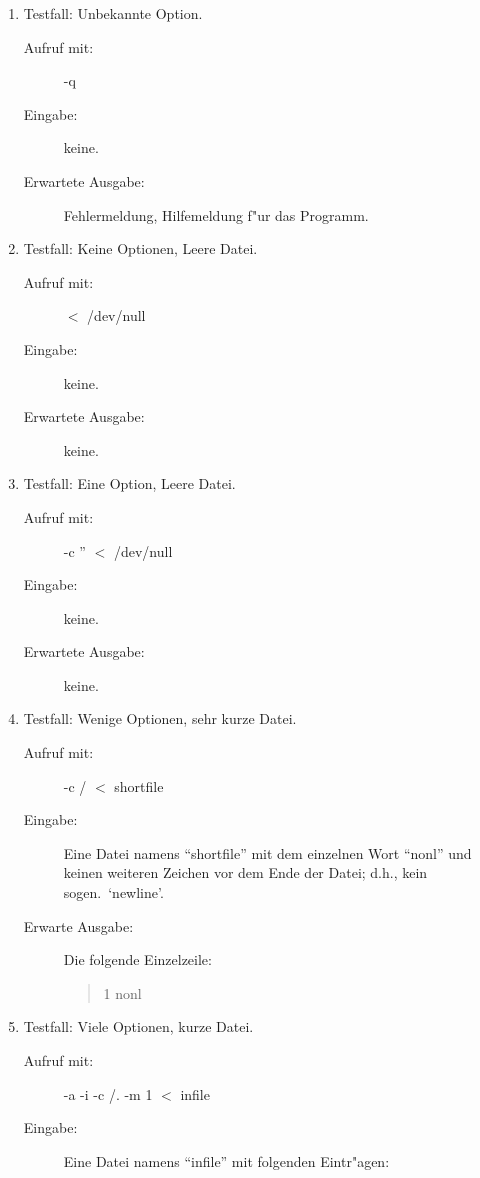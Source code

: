 \begin{enumerate}
\item Testfall: Unbekannte Option.

\begin{description}
\item[Aufruf mit:] -q
\item[Eingabe:] keine.
\item[Erwartete Ausgabe:] Fehlermeldung, Hilfemeldung f"ur das Programm.
\end{description}

\item Testfall: Keine Optionen, Leere Datei.

\begin{description}
\item[Aufruf mit:] $<$ /dev/null
\item[Eingabe:] keine.
\item[Erwartete Ausgabe:] keine.
\end{description}

\item Testfall: Eine Option, Leere Datei.

\begin{description}
\item[Aufruf mit:] -c '' $<$ /dev/null
\item[Eingabe:] keine.
\item[Erwartete Ausgabe:] keine.
\end{description}

\item Testfall: Wenige Optionen, sehr kurze Datei.

\begin{description}
\item[Aufruf mit:] -c / $<$ shortfile
\item[Eingabe:] Eine Datei namens ``shortfile'' mit dem einzelnen Wort
``nonl'' und keinen weiteren Zeichen vor dem Ende der Datei; d.h.,
kein sogen.\ `newline'. 
\item[Erwarte Ausgabe:]  Die folgende Einzelzeile:

	\begin{quote}
	1 nonl
	\end{quote}
\end{description}

\item Testfall: Viele Optionen, kurze Datei.

\begin{description}
\item[Aufruf mit:] -a -i -c /. -m 1 $<$ infile
\item[Eingabe:] Eine Datei namens ``infile'' mit folgenden Eintr"agen:


\end{description}
\end{enumerate}
